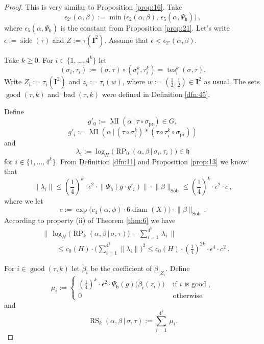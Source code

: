 \documentclass[10pt, a4paper]{amsart}
\theoremstyle{definition}
\numberwithin{equation}{section}
\newcommand{\opn}{\operatorname}
\newcommand{\mfrak}[1]{\mathfrak{#1}}
\newcommand{\mbf}[1]{\mathbf{#1}}
\newcommand{\mrm}[1]{\mathrm{#1}}
\newcommand{\smfrac}[2]{{\textstyle \frac{#1}{#2}}}
\newcommand{\bosum}{\sum\nolimits}
\newcommand{\til}[1]{\tilde{#1}}
\newcommand{\norm}[1]{\lVert #1 \rVert}
\newcommand{\Norm}[1]{\bigl\lVert\, #1 \, \bigr\rVert}
\renewcommand{\vert}{\, | \,}
\newcommand{\h}{\mfrak{h}}
\begin{document}
\begin{proof}
This is very similar to Proposition \ref{prop:16}.
Take 
\[ \epsilon_{2'}(\alpha, \beta) := \min \bigl( 
\epsilon_{2}(\alpha, \beta), \, \epsilon_{5}(\alpha, \Psi_{\h}) \bigr) \, , \]
where $\epsilon_{5}(\alpha, \Psi_{\h})$ is the constant from Proposition
\ref{prop:21}. 
Let's write $\epsilon := \opn{side}(\tau)$
and $Z := \tau(\mbf{I}^2)$. Assume that 
$\epsilon < \epsilon_{2'}(\alpha, \beta)$. 

Take $k \geq 0$. For $i \in \{ 1, \ldots, 4^k \}$ let
\[ (\sigma_i, \tau_i) := 
(\sigma, \tau) \circ (\sigma^k_i, \tau^k_i) = 
\opn{tes}^k_i (\sigma, \tau) . \]
Write
$Z_i := \tau_i(\mbf{I}^2)$ and $z_i := \tau_i(w)$, where
$w := (\smfrac{1}{2}, \smfrac{1}{2}) \in \mbf{I}^2$ as usual. 
The sets $\opn{good}(\tau, k)$ and $\opn{bad}(\tau, k)$ were defined in
Definition \ref{dfn:45}. 

Define 
\[ g'_0 := \opn{MI}(\alpha \vert \tau \circ \sigma_{\mrm{pr}}) \in G , \]
\[ g'_i := \opn{MI}(\alpha \vert 
(\tau \circ \sigma^k_i) * (\tau \circ \tau^k_i \circ \sigma_{\mrm{pr}})) \]
and 
\[ \lambda_i :=  \opn{log}_H \bigl( 
\opn{RP}_0(\alpha, \beta \vert \sigma_i, \tau_i) \bigr) \in \h  \]
for $i \in \{ 1, \ldots, 4^k \}$.
{}From Definition \ref{dfn:11} and Proposition \ref{prop:13} we know that
\begin{equation} \label{eqn:195}
\norm{ \lambda_i } \leq (\smfrac{1}{4})^k \cdot \epsilon^2 \cdot 
\norm{\Psi_{\h}(g \cdot g'_i)} \cdot \norm{\beta}_{\mrm{Sob}} 
\leq (\smfrac{1}{4})^k \cdot \epsilon^2 \cdot c  \, ,
\end{equation}
where we let
\[ c := \exp \bigl( c_4(\alpha, \phi) \cdot 6 \opn{diam}(X) \bigl) \cdot 
\norm{\beta}_{\mrm{Sob}} \, . \]
According to property (ii) of Theorem \ref{thm:6} we have
\begin{equation} \label{eqn:193}
\begin{aligned}
& \Norm{ \log_H \bigl( \opn{RP}_k(\alpha, \beta \vert \sigma, \tau) \bigr)
- \bosum_{i = 1}^{4^k} \, \lambda_i } \\
& \qquad \leq c_0(H) \cdot \bigl( \bosum_{i = 1}^{4^k} \norm{ \lambda_i }
\bigr)^2 \leq 
c_0(H) \cdot (\smfrac{1}{4})^{2 k} \cdot \epsilon^4 \cdot c^2  \, .
\end{aligned}
\end{equation}

For $i \in \opn{good}(\tau, k)$ let $\til{\beta}_i$ be the coefficient of 
$\beta|_{Z_i}$. Define 
\[ \mu_i := 
\begin{cases}
(\smfrac{1}{4})^k \cdot \epsilon^2 \cdot 
\Psi_{\h}(g) \bigl( \til{\beta}_i(z_i) \bigr) &
\text{ if } i \text{ is good }, \\
0 & \text{ otherwise} 
\end{cases} \]
and
\[ \opn{RS}_k(\alpha, \beta \vert \sigma, \tau) := 
\sum_{i = 1}^{4^k}\, \mu_i . \]


\end{proof}
\end{document}
